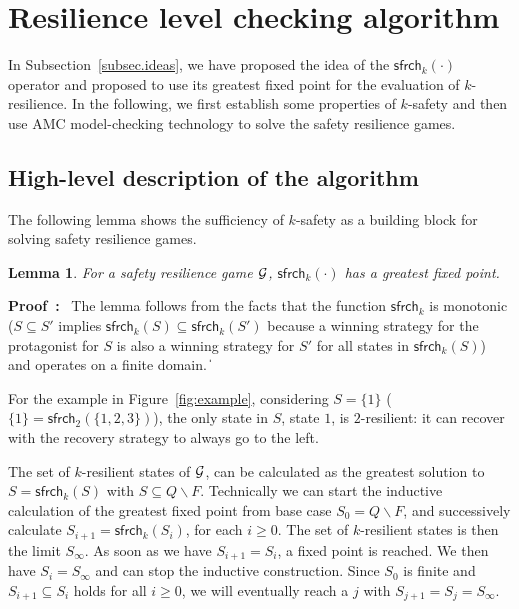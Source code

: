 \documentclass[times,10pt,twocolumn]{article}
\newtheorem{lemma}[theorem]{Lemma}
\newcommand\safe{\mathsf{sfrch}}
\newcommand\qed{\hfill\ensuremath{\Box}}
\newcommand{\pf}{\noindent\mbox{\bf Proof : }}
\newcommand{\calg}{{\cal G}}
\def\qed{\ifmmode\|\else{\unskip\nobreak\hfil
\penalty50\hskip1em\null\nobreak\hfil$\blacksquare$
\parfillskip=0pt\finalhyphendemerits=0\endgraf}\fi}
\begin{document}
\section{Resilience level checking algorithm \label{sec.mck}}
\label{sec:kresil}

In Subsection~\ref{subsec.ideas}, we have proposed the 
idea of the $\safe_k(\cdot)$ operator and proposed 
to use its greatest\label{reply2.empty.fixed point} fixed point 
for the evaluation of $k$-resilience.
In the following, we first establish some properties of $k$-safety 
and then use AMC model-checking technology to solve the 
safety resilience games.  


\subsection{High-level description of the algorithm} 

The following lemma shows the sufficiency of $k$-safety as a building block for 
solving safety resilience games.

\begin{lemma} 
\label{fixed point}
For a safety resilience game $\calg$, 
$\safe_k(\cdot)$ has a greatest fixed point.
\end{lemma}
\pf 
The lemma follows from the facts that
the function $\safe_k$ is monotonic
($S \subseteq S'$ implies $\safe_k ( S ) \subseteq \safe_k ( S' )$ 
because a winning strategy for the protagonist 
for $S$ is also a winning strategy for $S'$ 
for all states in $\safe_k(S)$) and operates on a finite domain.
\qed


For the example in Figure~\ref{fig:example}, 
considering $S=\{1\}$ ($\{1\}=\safe_2(\{1,2,3\})$), 
the only state in $S$, state $1$, is $2$-resilient: 
it can recover with the recovery strategy to always go to the left.

The set of $k$-resilient states of $\calg$, 
can be calculated as the greatest solution to 
$S=\safe_k(S)$ with $S\subseteq Q\smallsetminus F$. 
Technically\label{reply2.technically.comma} we can start the inductive calculation of the greatest fixed point 
from base case $S_0 = Q \smallsetminus F$, 
and successively calculate $S_{i+1} = \safe_k(S_i)$, 
for each $i\geq 0$. 
The set of $k$-resilient states is then the limit $S_\infty$.  
As soon as we have $S_{i+1}=S_i$, a fixed point is reached.
We then have $S_i=S_\infty$ and can stop the 
inductive construction.  
Since $S_0$ is finite and $S_{i+1}\subseteq S_i$ holds for all $i\geq 0$, 
we will eventually reach a $j$ with $S_{j+1}=S_j=S_\infty$. 
\end{document}
